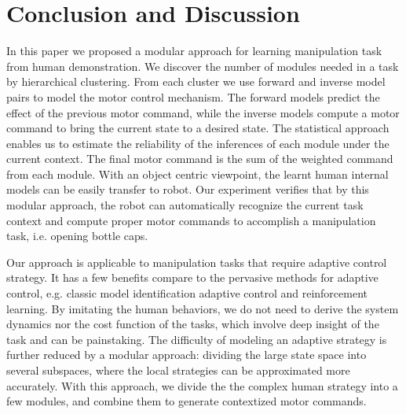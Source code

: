 \section{Conclusion and Discussion}
\label{sec:diss}
In this paper we proposed a modular approach for learning manipulation task from human demonstration. We discover the number of modules needed in a task by hierarchical clustering. From each cluster we use forward and inverse model pairs to model the motor control mechanism. The forward models predict the effect of the previous motor command, while the inverse models compute a motor command to bring the current state to a desired state. The statistical approach enables us to estimate the reliability of the inferences of each module under the current context. The final motor command is the sum of the weighted command from each module. With an object centric viewpoint, the learnt human internal models can be easily transfer to robot. Our experiment verifies that by this modular approach, the robot can automatically recognize the current task context and compute proper motor commands to accomplish a manipulation task, i.e. opening bottle caps.


Our approach is applicable to manipulation tasks that require adaptive control strategy. It has a few benefits compare to the pervasive methods for adaptive control, e.g. classic model identification adaptive control and reinforcement learning. By imitating the human behaviors, we do not need to derive the system dynamics nor the cost function of the tasks, which involve deep insight of the task and can be painstaking. The difficulty of modeling an adaptive strategy is further reduced by a modular approach: dividing the large state space into several subspaces, where the local strategies can be approximated more accurately. With this approach, we divide the the complex human strategy into a few modules, and combine them to generate contextized motor commands.

